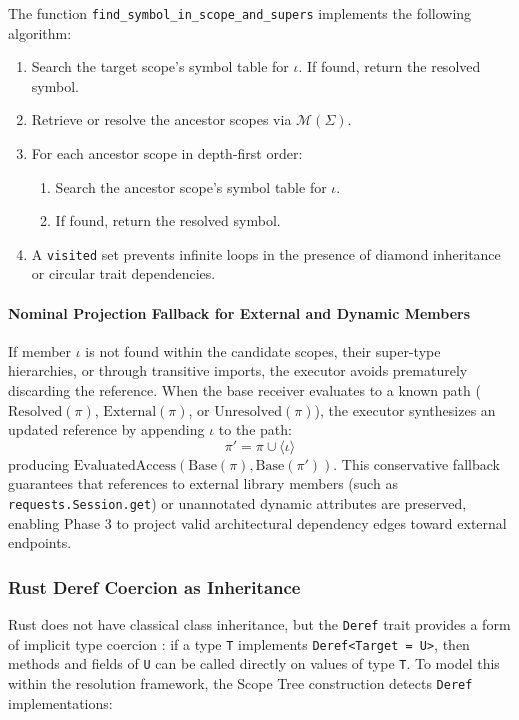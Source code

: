 The function \texttt{find\_symbol\_in\_scope\_and\_supers} implements
the following algorithm:

\begin{enumerate}
  \item Search the target scope's symbol table for $\iota$. If found,
    return the resolved symbol.
  \item Retrieve or resolve the ancestor scopes via $\mathcal{M}(\Sigma)$.
  \item For each ancestor scope in depth-first order:
    \begin{enumerate}
      \item Search the ancestor scope's symbol table for $\iota$.
      \item If found, return the resolved symbol.
    \end{enumerate}
  \item A \texttt{visited} set prevents infinite loops in the presence
    of diamond inheritance or circular trait dependencies.
\end{enumerate}

\paragraph{Nominal Projection Fallback for External and Dynamic Members}
If member $\iota$ is not found within the candidate scopes, their super-type
hierarchies, or through transitive imports, the executor avoids prematurely
discarding the reference. When the base receiver evaluates to a known path
($\text{Resolved}(\pi)$, $\text{External}(\pi)$, or $\text{Unresolved}(\pi)$),
the executor synthesizes an updated reference by appending $\iota$ to the path:
$$\pi' = \pi \cup \langle \iota \rangle$$
producing $\text{EvaluatedAccess}(\text{Base}(\pi), \text{Base}(\pi'))$.
This conservative fallback guarantees that references to external
library members
(such as \texttt{requests.Ses}\-\texttt{sion.get}) or unannotated
dynamic attributes are
preserved, enabling Phase 3 to project valid architectural dependency
edges toward
external endpoints.

\subsubsection{Rust Deref Coercion as Inheritance}

Rust does not have classical class inheritance, but the \texttt{Deref} trait
provides a form of implicit type coercion
\cite[Chapter~15]{klabnik_rust_2023}: if a type \texttt{T}
implements \texttt{Deref<Target = U>}, then methods and fields of \texttt{U} can
be called directly on values of type \texttt{T}. To model this within the
resolution framework, the Scope Tree construction detects
\texttt{Deref} implementations:

